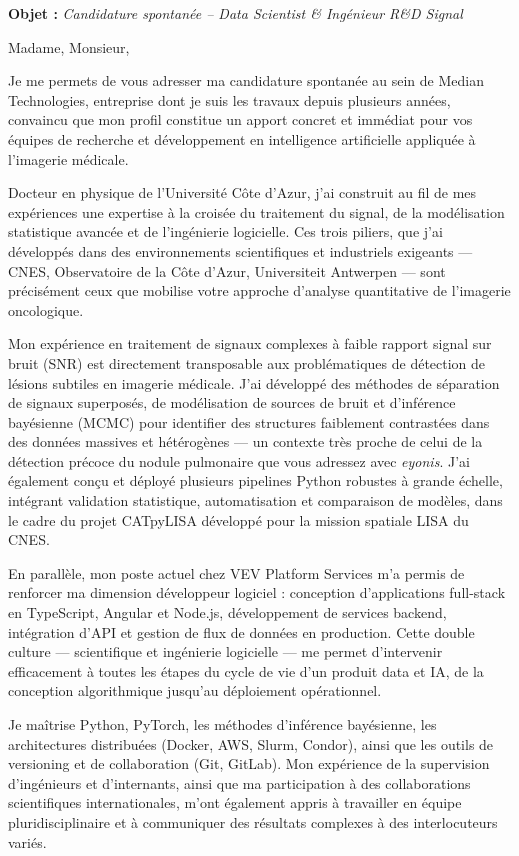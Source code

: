 \documentclass[11pt,a4paper]{../_shared/altacv}
\begin{document}
\makecvheader
\iffalse
{}
{\color{accent}\textbf{Objet :}} \textit{Candidature spontanée -- Data Scientist \& Ingénieur R\&D Signal}

{\color{body}

Madame, Monsieur,

Je me permets de vous adresser ma candidature spontanée au sein de Median Technologies, entreprise dont je suis les travaux depuis plusieurs années, convaincu que mon profil constitue un apport concret et immédiat pour vos équipes de recherche et développement en intelligence artificielle appliquée à l'imagerie médicale.

Docteur en physique de l'Université Côte d'Azur, j'ai construit au fil de mes expériences une expertise à la croisée du traitement du signal, de la modélisation statistique avancée et de l'ingénierie logicielle. Ces trois piliers, que j'ai développés dans des environnements scientifiques et industriels exigeants — CNES, Observatoire de la Côte d'Azur, Universiteit Antwerpen — sont précisément ceux que mobilise votre approche d'analyse quantitative de l'imagerie oncologique.

Mon expérience en traitement de signaux complexes à faible rapport signal sur bruit (SNR) est directement transposable aux problématiques de détection de lésions subtiles en imagerie médicale. J'ai développé des méthodes de séparation de signaux superposés, de modélisation de sources de bruit et d'inférence bayésienne (MCMC) pour identifier des structures faiblement contrastées dans des données massives et hétérogènes — un contexte très proche de celui de la détection précoce du nodule pulmonaire que vous adressez avec \textit{eyonis\texttrademark}. J'ai également conçu et déployé plusieurs pipelines Python robustes à grande échelle, intégrant validation statistique, automatisation et comparaison de modèles, dans le cadre du projet CATpyLISA développé pour la mission spatiale LISA du CNES.

En parallèle, mon poste actuel chez VEV Platform Services m'a permis de renforcer ma dimension développeur logiciel : conception d'applications full-stack en TypeScript, Angular et Node.js, développement de services backend, intégration d'API et gestion de flux de données en production. Cette double culture — scientifique et ingénierie logicielle — me permet d'intervenir efficacement à toutes les étapes du cycle de vie d'un produit data et IA, de la conception algorithmique jusqu'au déploiement opérationnel.

Je maîtrise Python, PyTorch, les méthodes d'inférence bayésienne, les architectures distribuées (Docker, AWS, Slurm, Condor), ainsi que les outils de versioning et de collaboration (Git, GitLab). Mon expérience de la supervision d'ingénieurs et d'internants, ainsi que ma participation à des collaborations scientifiques internationales, m'ont également appris à travailler en équipe pluridisciplinaire et à communiquer des résultats complexes à des interlocuteurs variés.

}
\end{document}
